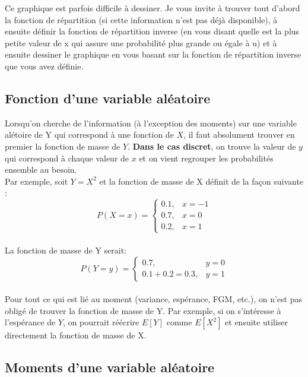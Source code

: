 \documentclass[10pt, french]{article}
\begin{document}
\begin{multicols*}{2}
\begin{definitionNOHFILLsub}
Ce graphique est parfois difficile à dessiner. Je vous invite à trouver tout d'abord la fonction de répartition (si cette information n'est pas déjà disponible), à ensuite définir la fonction de répartition inverse (en vous disant quelle est la plus petite valeur de x qui assure une probabilité plus grande ou égale à u) et à ensuite dessiner le graphique en vous basant sur la fonction de répartition inverse que vous avez définie.
\end{definitionNOHFILLsub}

\subsection{Fonction d'une variable aléatoire}

\begin{definitionNOHFILL}

Lorsqu'on cherche de l'information (à l'exception des moments) sur une variable alétoire de Y qui correspond à une fonction de $X$, il faut absolument trouver en premier la fonction de masse de $Y$. \textbf{Dans le cas discret}, on trouve la valeur de $y$ qui correspond à chaque valeur de $x$ et on vient regrouper les probabilités ensemble au besoin.\\

Par exemple, soit $Y = X^2$ et la fonction de masse de X définit de la façon suivante : 
$$P(X = x) = 
\left\{
	\begin{array}{ll}
		0.1,  &  x = -1\\
		0.7, & x = 0\\
		0.2, & x = 1
	\end{array}
\right.
$$\\

La fonction de masse de Y serait:
$$P(Y = y) = 
\left\{
	\begin{array}{ll}
		0.7, & y = 0\\
		0.1 + 0.2 = 0.3, & y = 1
	\end{array}
\right.
$$\\

Pour tout ce qui est lié au moment (variance, espérance, FGM, etc.), on n'est pas obligé de trouver la fonction de masse de Y. Par exemple, si on s'intéresse à l'espérance de $Y$, on pourrait réécrire $E[Y]$ comme $E[X^2]$ et ensuite utiliser directement la fonction de masse de X.
\end{definitionNOHFILL}

\subsection{Moments d'une variable aléatoire}



\end{multicols*}
\end{document}
